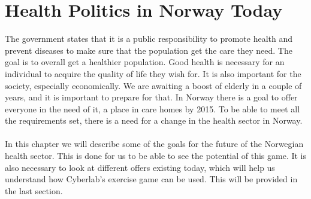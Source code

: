\chapter{Health Politics in Norway Today}
The government states that it is a public responsibility to promote health and prevent diseases to make sure that the population get the care they need. The goal is to overall get a healthier population. Good health is necessary for an individual to acquire the quality of life they wish for. It is also important for the society, especially economically. We are awaiting a boost of elderly in a couple of years, and it is important to prepare for that. In Norway there is a goal to offer everyone in the need of it, a place in care homes by 2015.  To be able to meet all the requirements set, there is a need for a change in the health sector in Norway.\\ \\
In this chapter we will describe some of the goals for the future of the Norwegian health sector. This is done for us to be able to see the potential of this game.  It is also necessary to look at different offers existing today, which will help us understand how Cyberlab's exercise game can be used. This will be provided in the last section. 

